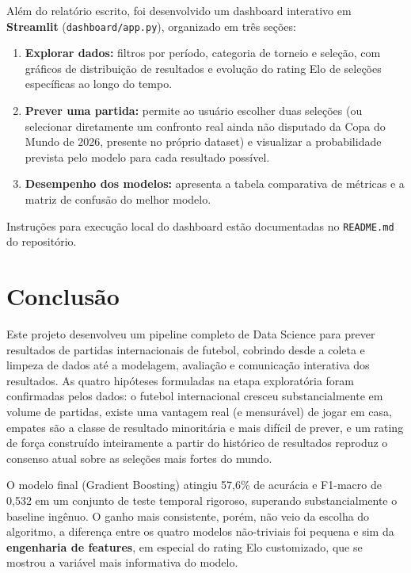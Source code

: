 \documentclass[12pt,a4paper]{article}
\begin{document}
Além do relatório escrito, foi desenvolvido um dashboard interativo em \textbf{Streamlit} (\texttt{dashboard/app.py}), organizado em três seções:

\begin{enumerate}
    \item \textbf{Explorar dados:} filtros por período, categoria de torneio e seleção, com gráficos de distribuição de resultados e evolução do
    rating Elo de seleções específicas ao longo do tempo.
    \item \textbf{Prever uma partida:} permite ao usuário escolher duas seleções (ou selecionar diretamente um confronto real ainda não disputado da Copa do Mundo de 2026, presente no próprio dataset) e visualizar a probabilidade prevista pelo modelo para cada resultado
    possível.
    \item \textbf{Desempenho dos modelos:} apresenta a tabela comparativa de métricas e a matriz de confusão do melhor modelo.
\end{enumerate}

Instruções para execução local do dashboard estão documentadas no
\texttt{README.md} do repositório.

\section{Conclusão}

Este projeto desenvolveu um pipeline completo de Data Science para prever resultados de partidas internacionais de futebol, cobrindo desde a coleta e limpeza de dados até a modelagem, avaliação e comunicação interativa dos resultados. As quatro hipóteses formuladas na etapa exploratória foram confirmadas pelos dados: o futebol internacional cresceu substancialmente em volume de partidas, existe uma vantagem real (e mensurável) de jogar em casa, empates são a classe de resultado minoritária e mais difícil de prever, e um rating de força construído inteiramente a partir do histórico de resultados reproduz o consenso atual sobre as seleções mais fortes do mundo.

O modelo final (Gradient Boosting) atingiu 57,6\% de acurácia e F1-macro de 0,532 em um conjunto de teste temporal rigoroso, superando substancialmente o baseline ingênuo. O ganho mais consistente, porém, não veio da escolha do algoritmo, a diferença entre os quatro modelos não-triviais foi pequena e sim da \textbf{engenharia de features}, em especial do rating Elo customizado, que se mostrou a variável mais informativa do modelo.
\end{document}
